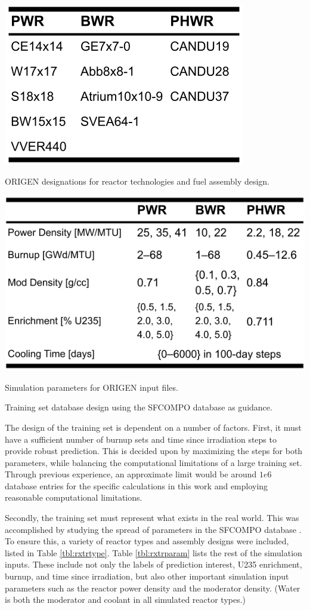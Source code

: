 \begin{table}[!htb]
  \centering
  \begin{subtable}{\linewidth}
    \centering
    \includegraphics[width=0.5\linewidth]{./chapters/exp1/trainset4_Orxtrs.png}
    \caption{\gls{ORIGEN} designations for reactor technologies and fuel assembly design.}
    \label{tbl:rxtrtype}
    \vspace*{5mm}
  \end{subtable}
  \begin{subtable}{\linewidth}
    \centering
    \includegraphics[width=0.75\linewidth]{./chapters/exp1/trainset4_inputs.png}
    \caption{Simulation parameters for \gls{ORIGEN} input files.}
    \label{tbl:rxtrparam}
  \end{subtable}%
  \caption{Training set database design using the \gls{SFCOMPO} database as guidance. \cite{sfcompo}}
  \label{tbl:train}
\end{table}

The design of the training set is dependent on a number of factors.  First, it
must have a sufficient number of burnup sets and time since irradiation steps
to provide robust prediction. This is decided upon by maximizing the steps for
both parameters, while balancing the computational limitations of a large
training set. Through previous experience, an approximate limit would be around
$1e6$ database entries for the specific calculations in this work and employing
reasonable computational limitations.

Secondly, the training set must represent what exists in the real world. This
was accomplished by studying the spread of parameters in the \gls{SFCOMPO}
database \cite{sfcompo}.  To ensure this, a variety of reactor types and
assembly designs were included, listed in Table \ref{tbl:rxtrtype}. Table
\ref{tbl:rxtrparam} lists the rest of the simulation inputs. These include not
only the labels of prediction interest, \gls{U235} enrichment, burnup, and time
since irradiation, but also other important simulation input parameters such as
the reactor power density and the moderator density.  (Water is both the
moderator and coolant in all simulated reactor types.)

